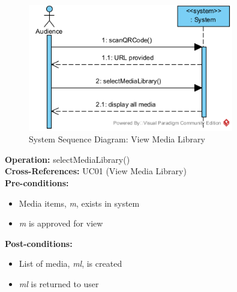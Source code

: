 \begin{figure}[H]
    \centering
    \includegraphics[width=0.8\textwidth]{images/SSD-UC01-ViewMediaLibrary.png}
    \centering
    \caption{System Sequence Diagram: View Media Library}
\end{figure}

\textbf{Operation:} selectMediaLibrary() \\
\textbf{Cross-References:} UC01 (View Media Library) \\
\textbf{Pre-conditions:}
\begin{itemize}
    \item Media items, \emph{m}, exists in system
    \item \emph{m} is approved for view
\end{itemize}
\textbf{Post-conditions: }
\begin{itemize}
    \item List of media, \emph{ml}, is created
    \item \emph{ml} is returned to user
\end{itemize}
